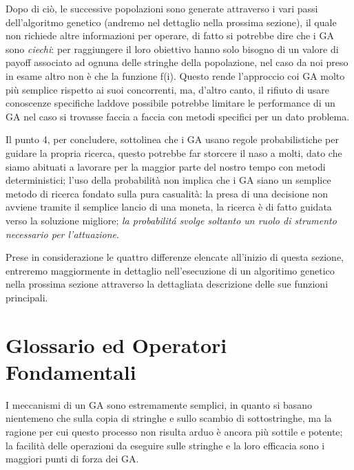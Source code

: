 Dopo di ci\`o, le successive popolazioni sono generate attraverso i vari passi dell'algoritmo genetico (andremo nel dettaglio nella prossima sezione), il quale non richiede altre informazioni per operare, di fatto si potrebbe dire che i GA sono \textit{ciechi}: per raggiungere il loro obiettivo hanno solo bisogno di un valore di payoff associato ad ognuna delle stringhe della popolazione, nel caso da noi preso in esame altro non \`e che la funzione f(i). Questo rende l'approccio coi GA molto pi\`u semplice rispetto ai suoi concorrenti, ma, d'altro canto, il rifiuto di usare conoscenze specifiche laddove possibile potrebbe limitare le performance di un GA nel caso si trovasse faccia a faccia con metodi specifici per un dato problema.
\vspace{3mm}

Il punto 4, per concludere, sottolinea che i GA usano regole probabilistiche per guidare la propria ricerca, questo potrebbe far storcere il naso a molti, dato che siamo abituati a lavorare per la maggior parte del nostro tempo con metodi deterministici; l'uso della probabilit\`a non implica che i GA siano un semplice metodo di ricerca fondato sulla pura casualit\`a: la presa di una decisione non avviene tramite il semplice lancio di una moneta, la ricerca \`e di fatto guidata verso la soluzione migliore; \textit{la probabilit\'a svolge soltanto un ruolo di strumento necessario per l'attuazione}.

Prese in considerazione le quattro differenze elencate all'inizio di questa sezione, entreremo maggiormente in dettaglio nell'esecuzione di un algoritimo genetico nella prossima sezione attraverso la dettagliata descrizione delle sue funzioni principali.
\section{Glossario ed Operatori Fondamentali}
I meccanismi di un GA sono estremamente semplici, in quanto si basano nientemeno che sulla copia di stringhe e sullo scambio di sottostringhe, ma la ragione per cui questo processo non risulta arduo \`e ancora pi\`u sottile e potente; la facilit\`a delle operazioni da eseguire sulle stringhe e la loro efficacia sono i maggiori punti di forza dei GA.
\vspace{3mm}

